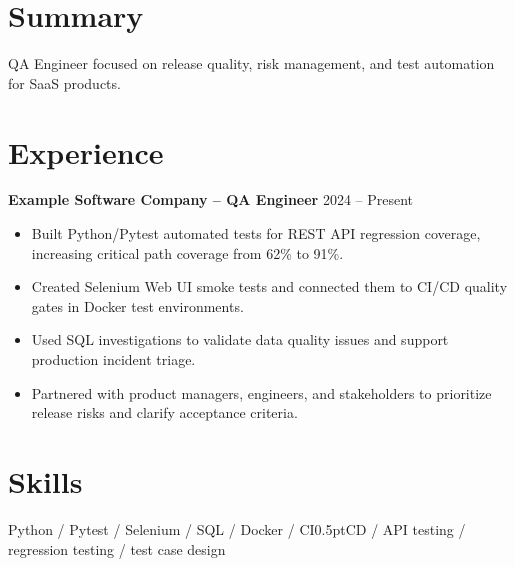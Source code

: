 \documentclass[letterpaper,11pt]{article}
\begin{document}
\section{Summary}
\small{QA Engineer focused on release quality, risk management, and test automation for SaaS products.}

\section{Experience}
\textbf{Example Software Company -- QA Engineer} \hfill 2024 -- Present
\begin{itemize}
  \item Built Python/Pytest automated tests for REST API regression coverage, increasing critical path coverage from 62\% to 91\%.
  \item Created Selenium Web UI smoke tests and connected them to CI/CD quality gates in Docker test environments.
  \item Used SQL investigations to validate data quality issues and support production incident triage.
  \item Partnered with product managers, engineers, and stakeholders to prioritize release risks and clarify acceptance criteria.
\end{itemize}

\section{Skills}
\small{Python / Pytest / Selenium / SQL / Docker / CI\kern0.5ptCD / API testing / regression testing / test case design}
\end{document}

